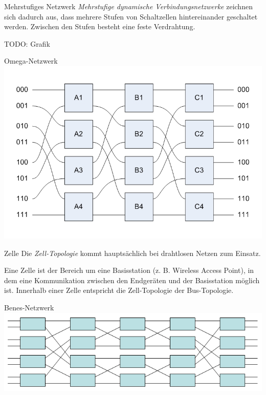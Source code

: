 \begin{defi}{Mehrstufiges Netzwerk}
    \emph{Mehrstufige dynamische Verbindungsnetzwerke} zeichnen sich dadurch aus, dass mehrere Stufen von Schaltzellen hintereinander geschaltet werden.
    Zwischen den Stufen besteht eine feste Verdrahtung.
    
    TODO: Grafik
\end{defi}

\begin{defi}{Omega-Netzwerk}
    \includegraphics[width=\textwidth]{images/OmegaNetwork.jpg}
\end{defi}

\begin{defi}{Zelle}
    Die \emph{Zell-Topologie} kommt hauptsächlich bei drahtlosen Netzen zum Einsatz.
    
    Eine Zelle ist der Bereich um eine Basisstation (z. B. Wireless Access Point), 
    in dem eine Kommunikation zwischen den Endgeräten und der Basisstation möglich ist.
    Innerhalb einer Zelle entspricht die Zell-Topologie der Bus-Topologie.
\end{defi}

\begin{defi}{Benes-Netzwerk}
    \includegraphics[width=\textwidth]{images/Benesnetwork.png}
\end{defi}

